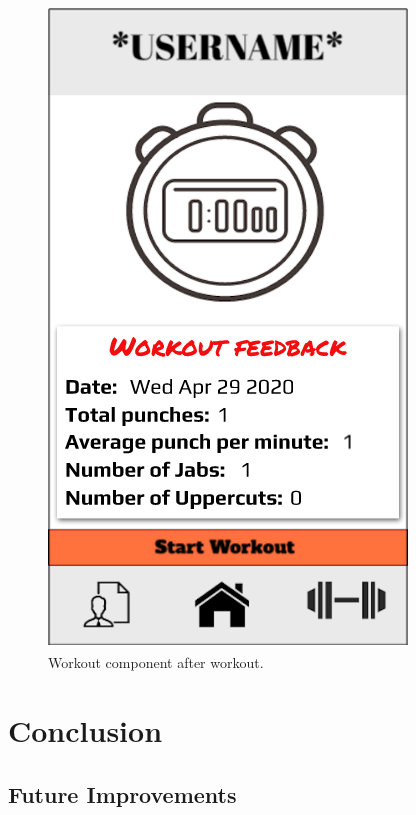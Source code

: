 \documentclass[a4paper,12pt]{report}
\begin{document}
    \begin{figure}[h]
        \begin{center}
        \includegraphics[scale=.47]{images/afterWorkout.png}
        \caption{Workout component after workout.}
        \label{fig:aWComponent}
        \end{center}
    \end{figure}


\chapter{Conclusion}
\section{Future Improvements}


\end{document}
